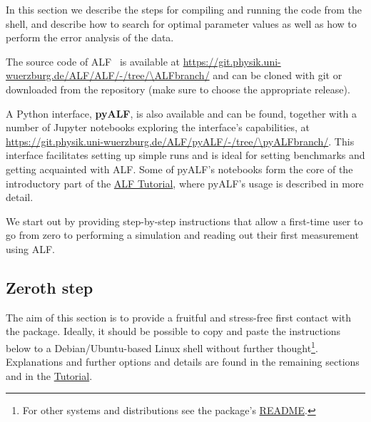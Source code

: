 


In this section we describe the steps for compiling and running the code from the shell, and describe how to search for optimal parameter values as well as how to perform the error analysis of the data.

The source code of ALF~\ALFver{} is available at \url{https://git.physik.uni-wuerzburg.de/ALF/ALF/-/tree/\ALFbranch/} and can be cloned with git or downloaded from the repository (make sure to choose the appropriate release).

A Python interface, \textbf{pyALF}, is also available and can be found, together with a number of Jupyter notebooks exploring the interface's capabilities, at \url{https://git.physik.uni-wuerzburg.de/ALF/pyALF/-/tree/\pyALFbranch/}. This interface facilitates setting up simple runs and is ideal for setting benchmarks and getting acquainted with ALF. Some of pyALF's notebooks form the core of the introductory part of the \href{https://git.physik.uni-wuerzburg.de/ALF/ALF_Tutorial/-/blob/master/Tutorial-ALF-\tutALFver/}{ALF Tutorial}, where pyALF's usage is described in more detail.

We start out by providing step-by-step instructions that allow a first-time user to go from zero to performing a simulation and reading out their first measurement using ALF.

\subsection{Zeroth step}
\label{sec:zeroth}

The aim of this section is to provide a fruitful and stress-free first contact with the package. Ideally, it should be possible to copy and paste the instructions below to a Debian/Ubuntu-based Linux shell without further thought\footnote{For other systems and distributions see the package's  \href{https://git.physik.uni-wuerzburg.de/ALF/ALF/-/blob/\ALFbranch/README.md}{README}.}. Explanations and further options and details are found in the remaining sections and in the \href{https://git.physik.uni-wuerzburg.de/ALF/ALF_Tutorial/-/blob/master/Tutorial-ALF-\tutALFver/}{Tutorial}.

